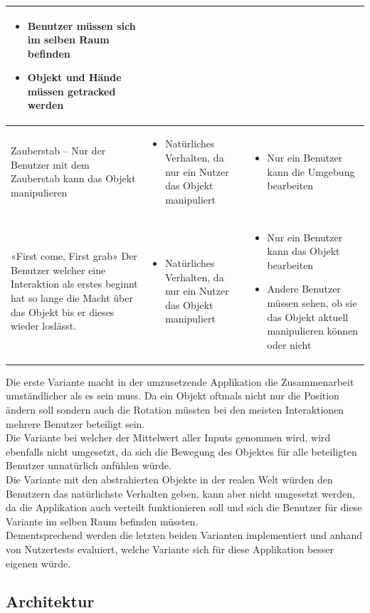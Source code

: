 \begin{center}
\begin{tabularx} {\textwidth} { | B | B | B | }
\begin{itemize} [leftmargin=*,noitemsep,topsep=0pt]
			\item Benutzer müssen sich im selben Raum befinden
			\item Objekt und Hände müssen getracked werden
		\end{itemize} \\
		\hline
		\vspace{1pt}
		Zauberstab – Nur der Benutzer mit dem Zauberstab kann das Objekt manipulieren &
		\begin{itemize} [leftmargin=*,noitemsep,topsep=0pt]
			\item Natürliches Verhalten, da nur ein Nutzer das Objekt manipuliert
		\end{itemize} &
		\begin{itemize} [leftmargin=*,noitemsep,topsep=0pt]
			\item Nur ein Benutzer kann die Umgebung bearbeiten
		\end{itemize} \\
		\hline	
		\vspace{1pt}
		«First come, First grab» Der Benutzer welcher eine Interaktion als erstes beginnt hat so lange die Macht über das Objekt bis er dieses wieder loslässt. & 
		\begin{itemize} [leftmargin=*,noitemsep,topsep=0pt]
			\item Natürliches Verhalten, da nur ein Nutzer das Objekt manipuliert
		\end{itemize} &
		\begin{itemize} [leftmargin=*,noitemsep,topsep=0pt]
			\item Nur ein Benutzer kann das Objekt bearbeiten
			\item Andere Benutzer müssen sehen, ob sie das Objekt aktuell manipulieren können oder nicht
		\end{itemize} \\
		\hline	
	\end{tabularx}
\end{center}
\label{tbl:varianten_gleichzeitige_interaktion}

\bigskip
Die erste Variante macht in der umzusetzende Applikation die Zusammenarbeit umständlicher als es sein muss. Da ein Objekt oftmals nicht nur die Position ändern soll sondern auch die Rotation müssten bei den meisten Interaktionen mehrere Benutzer beteiligt sein. \\
Die Variante bei welcher der Mittelwert aller Inputs genommen wird, wird ebenfalls nicht umgesetzt, da sich die Bewegung des Objektes für alle beteiligten Benutzer unnatürlich anfühlen würde. \\
Die Variante mit den abstrahierten Objekte in der realen Welt würden den Benutzern das natürlichste Verhalten geben, kann aber nicht umgesetzt werden, da die Applikation auch verteilt funktionieren soll und sich die Benutzer für diese Variante im selben Raum befinden müssten. \\
Dementsprechend werden die letzten beiden Varianten implementiert und anhand von Nutzertests evaluiert, welche Variante sich für diese Applikation besser eigenen würde.

\subsection{Architektur}